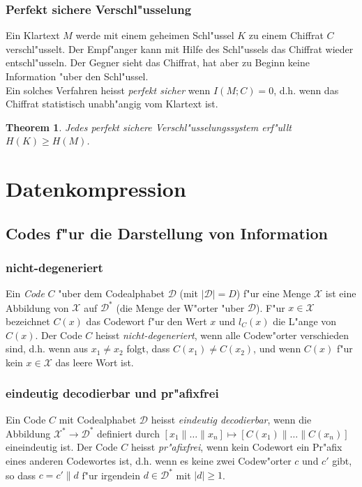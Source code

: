 \documentclass[german, 10pt, a4paper, twocolumn]{scrartcl}
\newtheorem{theorem}{Theorem}
\begin{document}
\subsubsection{Perfekt sichere Verschl"usselung}

Ein Klartext $M$ werde mit einem geheimen Schl"ussel $K$ zu einem Chiffrat $C$ verschl"usselt. Der Empf"anger kann mit Hilfe des Schl"ussels das Chiffrat wieder entschl"usseln. Der Gegner sieht das Chiffrat, hat aber zu Beginn keine Information "uber den Schl"ussel.\\

Ein solches Verfahren heisst \textit{perfekt sicher} wenn $I(M;C)=0$, d.h. wenn das Chiffrat statistisch unabh"angig vom Klartext ist.

\begin{theorem}
	Jedes perfekt sichere Verschl"usselungssystem erf"ullt $H(K)\geq H(M)$.
\end{theorem}


\section{Datenkompression}

\subsection{Codes f"ur die Darstellung von Information}


\subsubsection{nicht-degeneriert}
Ein \textit{Code} $C$ "uber dem Codealphabet $\mathcal{D}$ (mit $|\mathcal{D}|=D$) f"ur eine Menge $\mathcal{X}$ ist eine Abbildung von $\mathcal{X}$ auf $\mathcal{D}^\ast$ (die Menge der W"orter "uber $\mathcal{D}$). F"ur $x\in \mathcal{X}$ bezeichnet $C(x)$ das Codewort f"ur den Wert $x$ und $l_C(x)$ die L"ange von $C(x)$. Der Code $C$ heisst \textit{nicht-degeneriert}, wenn alle Codew"orter verschieden sind, d.h. wenn aus $x_1\neq x_2$ folgt, dass $C(x_1)\neq C(x_2)$, und wenn $C(x)$ f"ur kein $x\in \mathcal{X}$ das leere Wort ist.

\subsubsection{eindeutig decodierbar und pr"afixfrei}
Ein Code $C$ mit Codealphabet $\mathcal{D}$ heisst \textit{eindeutig decodierbar}, wenn die Abbildung $\mathcal{X}^\ast \rightarrow \mathcal{D}^\ast$ definiert durch $[x_1\parallel\ldots\parallel x_n] \mapsto [C(x_1)\parallel \ldots \parallel C(x_n)]$ eineindeutig ist. Der Code $C$ heisst \textit{pr"afixfrei}, wenn kein Codewort ein Pr"afix eines anderen Codewortes ist, d.h. wenn es keine zwei Codew"orter $c$ und $c'$ gibt, so dass $c=c'\parallel d$ f"ur irgendein $d\in \mathcal{D}^\ast$ mit $|d|\geq 1$.\\
\end{document}
